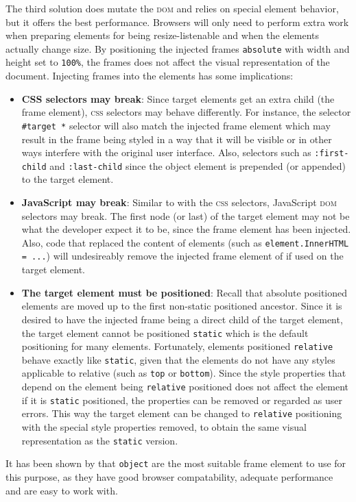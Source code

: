 \documentclass[a4paper,11pt]{kth-mag}
\newcommand{\code}[1]{\texttt{#1}}
\begin{document}
          The third solution does mutate the \textsc{dom} and relies on special element behavior, but it offers the best performance.
          Browsers will only need to perform extra work when preparing elements for being resize-listenable and when the elements actually change size.
          By positioning the injected frames \code{absolute} with width and height set to \code{100\%}, the frames does not affect the visual representation of the document.
          Injecting frames into the elements has some implications:
          \begin{itemize}
            \item \textbf{CSS selectors may break}:
              Since target elements get an extra child (the frame element), \textsc{css} selectors may behave differently.
              For instance, the selector \code{\#target *} selector will also match the injected frame element which may result in the frame being styled in a way that it will be visible or in other ways interfere with the original user interface.
              Also, selectors such as \code{:first-child} and \code{:last-child} since the object element is prepended (or appended) to the target element.
            \item \textbf{JavaScript may break}:
              Similar to with the \textsc{css} selectors, JavaScript \textsc{dom} selectors may break.
              The first node (or last) of the target element may not be what the developer expect it to be, since the frame element has been injected.
              Also, code that replaced the content of elements (such as \code{element.InnerHTML = ...}) will undesireably remove the injected frame element of if used on the target element.
            \item \textbf{The target element must be positioned}:
              Recall that absolute positioned elements are moved up to the first non-static positioned ancestor.
              Since it is desired to have the injected frame being a direct child of the target element, the target element cannot be positioned \code{static} which is the default positioning for many elements.
              Fortunately, elements positioned \code{relative} behave exactly like \code{static}, given that the elements do not have any styles applicable to relative (such as \code{top} or \code{bottom}).
              Since the style properties that depend on the element being \code{relative} positioned does not affect the element if it is \code{static} positioned, the properties can be removed or regarded as user errors.
              This way the target element can be changed to \code{relative} positioning with the special style properties removed, to obtain the same visual representation as the \code{static} version.
          \end{itemize}
          It has been shown by \cite{backalley} that \code{object} are the most suitable frame element to use for this purpose, as they have good browser compatability, adequate performance and are easy to work with.
\end{document}
